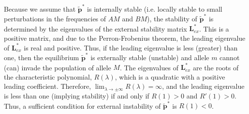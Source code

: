 \documentclass[12pt]{extarticle}
\let\vec\mathbf
\newcommand{\cl}{\mathbf{L}}
\begin{document}
\begin{appendices}
Because we assume that $\vec{\tilde{p}^*}$ is internally stable (i.e. locally stable to small perturbations in the frequencies of $AM$ and $BM$), the stability of 
$\vec{\tilde{p}^*}$ is determined by the eigenvalues of the external stability matrix $\cl^*_{ex}$.
This is a positive matrix, and due to the Perron-Frobenius theorem, the leading eigenvalue of $\cl^*_{ex}$ is real and positive.
Thus, if the leading eigenvalue is less (greater) than one, then the equilibrium $\vec{\tilde{p}^*}$ is externally stable (unstable) and allele $m$ cannot (can) invade the population of allele $M$. 
The eigenvalues of $\cl^*_{ex}$ are the roots of the characteristic polynomial, $R(\lambda)$,
which is a quadratic with a positive leading coefficient. Therefore, $\lim_{\lambda \to \pm \infty} R(\lambda) = \infty$, and the leading eigenvalue is less than one (implying stability) if and only if $R(1)>0$ and $R'(1)>0$.
Thus, a sufficient condition for external instability of $\vec{\tilde{p}^*}$ is $R(1) < 0$.


\end{appendices}
\end{document}
